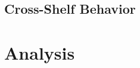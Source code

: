 \documentclass[11pt]{article}
\begin{document}
\subsection{Cross-Shelf Behavior}

\section{Analysis}



\end{document}
